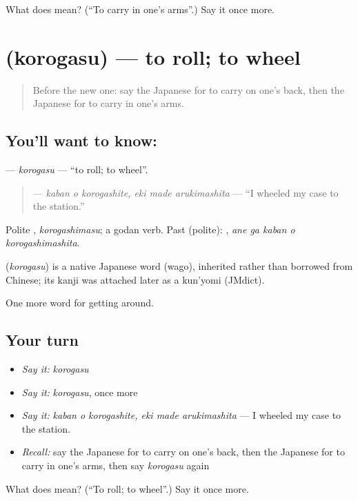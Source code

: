 \begin{tcolorbox}[breakable,colback=teal!4,colframe=teal!35!black,title={Before you move on}]
What does  mean? (\textquotedblleft{}To carry in one's arms\textquotedblright{}.) Say it once more.
\end{tcolorbox}
\section[\texorpdfstring{\ja{ころがす} (korogasu)}{ころがす (korogasu)}]{ (korogasu) — to roll; to wheel}

\label{lesson:JA-C417-korogasu}



\begin{quote}
Before the new one: say the Japanese for to carry on one's back, then the Japanese for to carry in one's arms.
\end{quote}

\subsection*{You'll want to know: }
\textbf{} — \emph{korogasu} — \textquotedblleft{}to roll; to wheel\textquotedblright{}.

\begin{quote}
\textbf{  } — \emph{kaban o korogashite, eki made arukimashita} — \textquotedblleft{}I wheeled my case to the station.\textquotedblright{}
\end{quote}

Polite \textbf{}, \emph{korogashimasu}; a godan verb. Past (polite): \textbf{  }, \emph{ane ga kaban o korogashimashita}.

\begin{cousinweb}
\textbf{} (\emph{korogasu}) is a native Japanese word (wago), inherited rather than borrowed from Chinese; its kanji was attached later as a kun'yomi (JMdict).
\end{cousinweb}

\begin{grammarlens}[title={What you've built}]
One more word for getting around.
\end{grammarlens}

\subsection*{Your turn}
\begin{itemize}
\raggedright
  \item \emph{Say it:} \emph{korogasu}
  \item \emph{Say it:} \emph{korogasu}, once more
  \item \emph{Say it:} \emph{kaban o korogashite, eki made arukimashita} — I wheeled my case to the station.
  \item \emph{Recall:} say the Japanese for to carry on one's back, then the Japanese for to carry in one's arms, then say \emph{korogasu} again
\end{itemize}

\begin{tcolorbox}[breakable,colback=teal!4,colframe=teal!35!black,title={Before you move on}]
What does  mean? (\textquotedblleft{}To roll; to wheel\textquotedblright{}.) Say it once more.
\end{tcolorbox}
